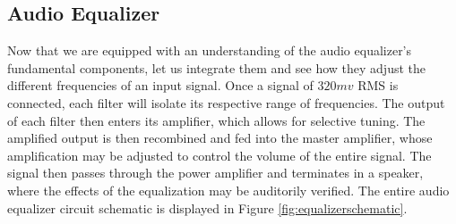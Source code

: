 \documentclass[notitlepage, 12pt]{report}
\begin{document}
\subsection*{Audio Equalizer}
Now that we are equipped with an understanding of the audio equalizer's 
fundamental components, let us integrate them and see how they adjust 
the different frequencies of an input signal. Once a signal of $320 mv$ RMS is 
connected, each filter will isolate its respective range of frequencies. 
The output of each filter then enters its amplifier, which allows for selective 
tuning. The amplified output is then recombined and fed into the master 
amplifier, whose amplification may be adjusted to control the volume of the entire signal. 
The signal then passes through the power amplifier and terminates in a speaker, where 
the effects of the equalization may be auditorily verified.  
The entire audio equalizer circuit schematic is displayed in Figure \ref{fig:equalizerschematic}. 
\end{document}
